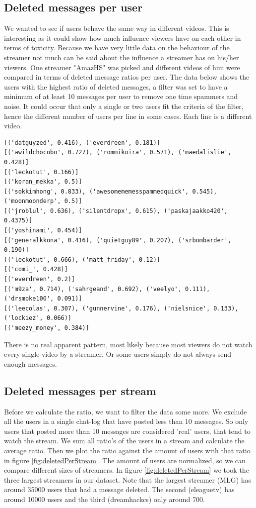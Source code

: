 \documentclass[final]{report}
\begin{document}
\subsection{Deleted messages per user}
We wanted to see if users behave the same way in different videos. This is interesting as it could show how much influence viewers have on each other in terms of toxicity. Because we have very little data on the behaviour of the streamer not much can be said about the influence a streamer has on his/her viewers. One streamer "AmazHS" was picked and different videos of him were compared in terms of deleted message ratios per user. The data below shows the users with the highest ratio of deleted messages, a filter was set to have a minimum of at least 10 messages per user to remove one time spammers and noise. It could occur that only a single or two users fit the criteria of the filter, hence the different number of users per line in some cases. Each line is a different video.

\begin{verbatim}
[('datguyzed', 0.416), ('everdreen', 0.181)]
[('awildchocobo', 0.727), ('rommikoira', 0.571), ('maedalislie', 0.428)]
[('leckotut', 0.166)]
[('koran_mekka', 0.5)]
[('sokkimhong', 0.833), ('awesomememesspammedquick', 0.545), ('moonmoonderp', 0.5)]
[('jroblul', 0.636), ('silentdropx', 0.615), ('paskajaakko420', 0.4375)]
[('yoshinami', 0.454)]
[('generalkkona', 0.416), ('quietguy89', 0.207), ('srbombarder', 0.190)]
[('leckotut', 0.666), ('matt_friday', 0.12)]
[('comi_', 0.428)]
[('everdreen', 0.2)]
[('m9za', 0.714), ('sahrgeand', 0.692), ('veelyo', 0.111), ('drsmoke100', 0.091)]
[('leecolas', 0.307), ('gunnervine', 0.176), ('nielsnice', 0.133), ('lockiez', 0.066)]
[('meezy_money', 0.384)]
\end{verbatim}

There is no real apparent pattern, most likely because most viewers do not watch every single video by a streamer. Or some users simply do not always send enough messages.\\

\subsection{Deleted messages per stream}
Before we calculate the ratio, we want to filter the data some more. We exclude all the users in a single chat-log that have posted less than 10 messages. So only users that posted more than 10 messages are considered 'real' users, that tend to watch the stream. 
We sum all ratio's of the users in a stream and calculate the average ratio. Then we plot the ratio against the amount of users with that ratio in figure \ref{fig:deletedPerStream}. The amount of users are normalized, so we can compare different sizes of streamers.
In figure \ref{fig:deletedPerStream} we took the three largest streamers in our dataset. Note that the largest streamer (MLG) has around 35000 users that had a message deleted. The second (eleaguetv) has around 10000 users and the third (dreamhackcs) only around 700.
\end{document}

